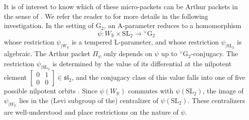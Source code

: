 \documentclass[a4paper, 11pt]{article}
\begin{document}
It is of interest to know which of these micro-packets can be 
Arthur packets in the sense of \cite[Section 22]{ABV}.  We refer the
reader to \cite[Section 22]{ABV} for more details in the following
investigation.  In the setting
of $\mathrm{G}_{2}$, an A-parameter reduces to a homomorphism
$$\psi: W_{\mathbb{R}} \times \mathrm{SL}_{2}  \rightarrow
{^\vee}\mathrm{G}_{2}$$
whose restriction $\psi_{|W_{\mathbb{R}}}$ is a tempered L-parameter,
and whose restriction $\psi_{|\mathrm{SL}_{2}}$ is algebraic.  The
Arthur packet $\Pi_{\psi}$ only depends on $\psi$ up to
${^\vee}\mathrm{G}_{2}$-conjugacy.  The 
restriction $\psi_{|\mathrm{SL}_{2}}$ is determined by the value of
its differential at the nilpotent element
$\begin{bmatrix} 0 & 1 \\ 0 &  0 \end{bmatrix} \in \mathfrak{sl}_{2}$, 
and the conjugacy 
class of this value falls into one of five possible nilpotent orbits
\cite[Section 6.20, Section 7.18]{HumphCC}.  Since
$\psi(W_{\mathbb{R}})$ commutes with $\psi(\mathrm{SL}_{2})$, the
image of $\psi_{|W_{\mathbb{R}}}$ lies in the (Levi subgroup of the)
centralizer of $\psi(\mathrm{SL}_{2})$.  These centralizers are well-understood
\cite[Section 13.1]{Carter85} and place restrictions on the nature of
$\psi$. 
\end{document}
